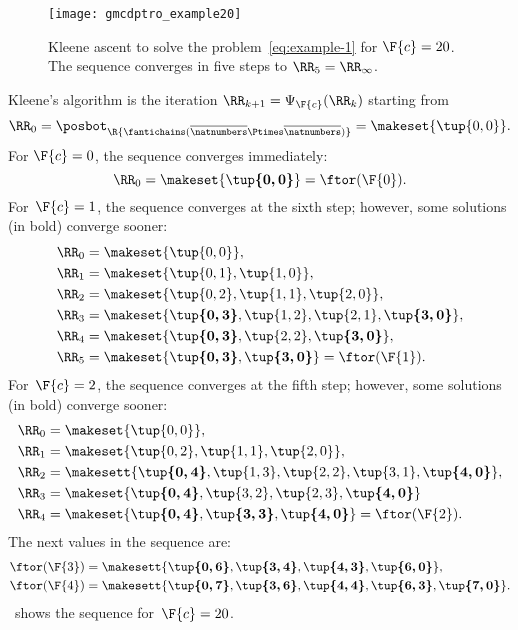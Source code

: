 \begin{figure}
    \centering
    \texttt{[image: gmcdptro\_example20]}
    \caption{
        Kleene ascent to solve the problem~\cref{eq:example-1} for $\F{c}=20$.
        The sequence converges in five steps to $\RR_{5}=\RR_{\infty}$.
    }
    \label{fig:example24}
\end{figure}
%
Kleene's algorithm is the iteration $\RR_{k+1}=\Psi_{\F{c}}(\RR_{k})$ starting from
\begin{equation}
    \RR_{0}
    =
    \posbot_{\R{\fantichains(\overline{\natnumbers}\Ptimes\overline{\natnumbers})}}
    =\makeset{\tup{ 0,0} }.
\end{equation}
%
For $\F{c}=0$, the sequence converges immediately:
%
\begin{equation}
    \RR_{0}=\makeset{\boldsymbol{\tup{0,0}}}=\ftor(\F{0}).
\end{equation}
%
For~$\F{c}=1$, the sequence converges at the sixth step; however, some solutions (in bold) converge sooner:
%
\begin{align}
    \RR_{0} & =\makeset{\tup{0,0} }, \\
    \RR_{1} & =\makeset{\tup{0,1},\tup{1,0}}, \\
    \RR_{2} & =\makeset{\tup{0,2},\tup{1,1}, \tup{2,0}}, \\
    \RR_{3} & =\makeset{\boldsymbol{\tup{0,3}},\tup{1,2}, \tup{2,1},\boldsymbol{\tup{3,0}}}, \\
    \RR_{4} & =\makeset{\boldsymbol{\tup{0,3}},\tup{2,2},\boldsymbol{\tup{3,0}}}, \\
    \RR_{5} & =\makeset{\boldsymbol{\tup{0,3}},\boldsymbol{\tup{3,0}}}=\ftor(\F{1}).
\end{align}
%
For~$\F{c}=2$, the sequence converges at the fifth step; however, some solutions (in bold) converge sooner:
%
\begin{align}
    \RR_{0} & =\makeset{\tup{ 0,0} }, \\
    \RR_{1} & =\makeset{\tup{ 0,2},\tup{ 1,1},\tup{ 2,0} }, \\
    \RR_{2} & =\makesett{ \boldsymbol{\tup{ 0,4} }, \tup{1,3}, \tup{2,2}, \tup{3,1}, \boldsymbol{\tup{ 4,0} }}, \\
    \RR_{3} & =\makeset{\boldsymbol{\tup{0,4} },\tup{ 3,2}, \tup{2,3}, \boldsymbol{\tup{ 4,0} }} \\
    \RR_{4} & =\makeset{\boldsymbol{\tup{0,4} },\boldsymbol{\tup{ 3,3}},\boldsymbol{\tup{ 4,0} }}=\ftor(\F{2}).
\end{align}
%
The next values in the sequence are:
%
\begin{align}
    \ftor(\F{3}) & =\makesett{ \boldsymbol{\tup{ 0,6} },\boldsymbol{\tup{ 3,4} },\boldsymbol{\tup{ 4,3} },\boldsymbol{\tup{ 6,0} }}, \\
    \ftor(\F{4}) & =\makesett{ \boldsymbol{\tup{ 0,7} },\boldsymbol{\tup{ 3,6} },\boldsymbol{\tup{ 4,4} },\boldsymbol{\tup{ 6,3} },\boldsymbol{\tup{ 7,0} }} .
\end{align}
%
~shows the sequence for~$\F{c}=20$.

